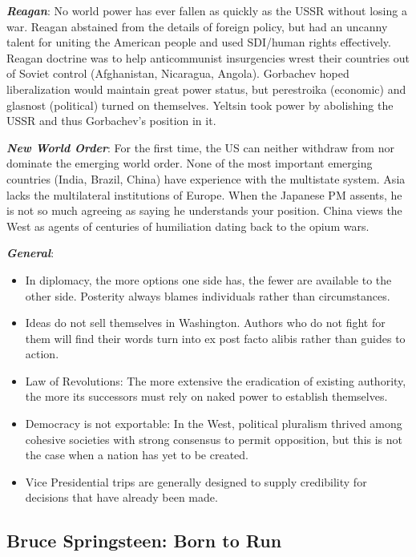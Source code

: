 \documentclass[
]{article}
\begin{document}
\textbf{\emph{Reagan}}: No world power has ever fallen as quickly as the
USSR without losing a war. Reagan abstained from the details of foreign
policy, but had an uncanny talent for uniting the American people and
used SDI/human rights effectively. Reagan doctrine was to help
anticommunist insurgencies wrest their countries out of Soviet control
(Afghanistan, Nicaragua, Angola). Gorbachev hoped liberalization would
maintain great power status, but perestroika (economic) and glasnost
(political) turned on themselves. Yeltsin took power by abolishing the
USSR and thus Gorbachev's position in it.

\textbf{\emph{New World Order}}: For the first time, the US can neither
withdraw from nor dominate the emerging world order. None of the most
important emerging countries (India, Brazil, China) have experience with
the multistate system. Asia lacks the multilateral institutions of
Europe. When the Japanese PM assents, he is not so much agreeing as
saying he understands your position. China views the West as agents of
centuries of humiliation dating back to the opium wars.

\textbf{\emph{General}}:

\begin{itemize}
\item
  In diplomacy, the more options one side has, the fewer are available
  to the other side. Posterity always blames individuals rather than
  circumstances.
\item
  Ideas do not sell themselves in Washington. Authors who do not fight
  for them will find their words turn into ex post facto alibis rather
  than guides to action.
\item
  Law of Revolutions: The more extensive the eradication of existing
  authority, the more its successors must rely on naked power to
  establish themselves.
\item
  Democracy is not exportable: In the West, political pluralism thrived
  among cohesive societies with strong consensus to permit opposition,
  but this is not the case when a nation has yet to be created.
\item
  Vice Presidential trips are generally designed to supply credibility
  for decisions that have already been made.
\end{itemize}

\hypertarget{bruce-springsteen-born-to-run}{%
\subsection{Bruce Springsteen: Born to
Run}\label{bruce-springsteen-born-to-run}}
\end{document}
